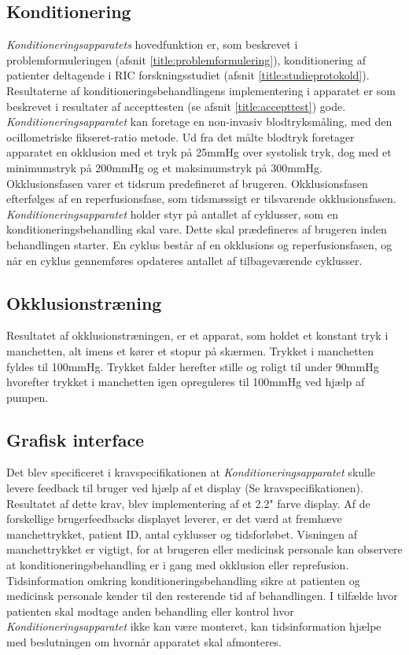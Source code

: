 \subsection{Konditionering}
\textit{Konditioneringsapparatets} hovedfunktion er, som beskrevet i problemformuleringen (afsnit \ref{title:problemformulering}), konditionering af patienter deltagende i RIC forskningsstudiet (afsnit \ref{title:studieprotokold}). Resultaterne af konditioneringsbehandlingens implementering i apparatet er som beskrevet i resultater af accepttesten (se afsnit \ref{title:accepttest}) gode. \textit{Konditioneringsapparatet} kan foretage en non-invasiv blodtryksmåling, med den ocillometriske fikseret-ratio metode. Ud fra det målte blodtryk foretager apparatet en okklusion med et tryk på 25mmHg over systolisk tryk, dog med et minimumstryk på 200mmHg og et maksimumstryk på 300mmHg. Okklusionsfasen varer et tidsrum predefineret af brugeren. Okklusionsfasen efterfølges af en reperfusionsfase, som tidsmæssigt er tilsvarende okklusionsfasen. \textit{Konditioneringsapparatet} holder styr på antallet af cyklusser, som en konditioneringsbehandling skal vare. Dette skal prædefineres af brugeren inden behandlingen starter. En cyklus består af en okklusions og reperfusionsfasen, og når en cyklus gennemføres opdateres antallet af tilbageværende cyklusser. 

\subsection{Okklusionstræning}
Resultatet af okklusionstræningen, er et apparat, som holdet et konstant tryk i manchetten, alt imens et kører et stopur på skærmen. Trykket i manchetten fyldes til 100mmHg. Trykket falder herefter stille og roligt til under 90mmHg hvorefter trykket i manchetten igen opreguleres til 100mmHg ved hjælp af pumpen. 
 
\subsection{Grafisk interface}
Det blev specificeret i kravspecifikationen at \textit{Konditioneringsapparatet} skulle levere feedback til bruger ved hjælp af et display (Se kravspecifikationen). Resultatet af dette krav, blev implementering af et 2.2" farve display. Af de forskellige brugerfeedbacks displayet leverer, er det værd at fremhæve manchettrykket, patient ID, antal cyklusser og tidsforløbet. Visningen af manchettrykket er vigtigt, for at brugeren eller medicinsk personale kan observere at konditioneringsbehandling er i gang med okklusion eller reprefusion. Tidsinformation omkring konditioneringsbehandling sikre at patienten og medicinsk personale kender til den resterende tid af behandlingen. I tilfælde hvor patienten skal modtage anden behandling eller kontrol hvor \textit{Konditioneringsapparatet} ikke kan være monteret, kan tidsinformation hjælpe med beslutningen om hvornår apparatet skal afmonteres. 

